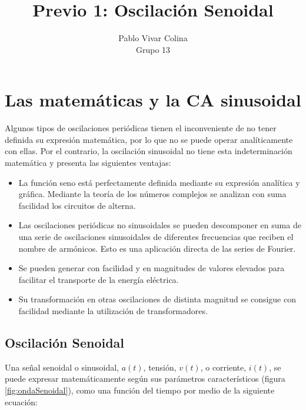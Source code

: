 \documentclass{article}
\title{Previo 1: Oscilación Senoidal}
\author{Pablo Vivar Colina\\
Grupo 13
}
\begin{document}
\maketitle


\section{Las matemáticas y la CA sinusoidal}

Algunos tipos de oscilaciones periódicas tienen el inconveniente de no tener definida su expresión matemática, por lo que no se puede operar analíticamente con ellas. Por el contrario, la oscilación sinusoidal no tiene esta indeterminación matemática y presenta las siguientes ventajas:\citep{CA}\\

\begin{itemize}
    \item La función seno está perfectamente definida mediante su expresión analítica y gráfica. Mediante la teoría de los números complejos se analizan con suma facilidad los circuitos de alterna.
    
    \item Las oscilaciones periódicas no sinusoidales se pueden descomponer en suma de una serie de oscilaciones sinusoidales de diferentes frecuencias que reciben el nombre de armónicos. Esto es una aplicación directa de las series de Fourier.
    
    \item Se pueden generar con facilidad y en magnitudes de valores elevados para facilitar el transporte de la energía eléctrica.
    
    \item Su transformación en otras oscilaciones de distinta magnitud se consigue con facilidad mediante la utilización de transformadores.
    
\end{itemize}

\subsection{Oscilación Senoidal}

Una señal senoidal o sinusoidal, $a(t)$, tensión, $v(t)$, o corriente, $i(t)$, se puede expresar matemáticamente según sus parámetros característicos (figura \ref{fig:ondaSenoidal}), como una función del tiempo por medio de la siguiente ecuación:\citep{CA}
\end{document}

